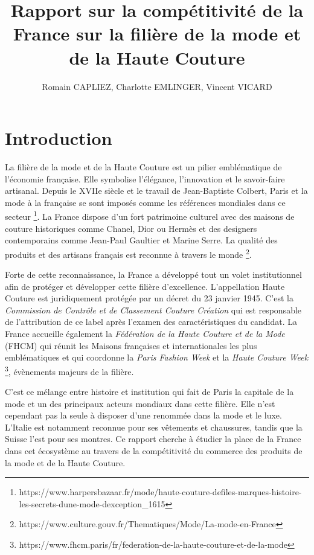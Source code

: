 \documentclass[french,10pt,a4paper]{article}
\title{Rapport sur la compétitivité de la France sur la filière de la mode et de la Haute Couture}
\author{Romain CAPLIEZ, Charlotte EMLINGER, Vincent VICARD}
\begin{document}
\maketitle

\newpage
{}
\tableofcontents
{}

\newpage

\section{Introduction}

La filière de la mode et de la Haute Couture est un pilier emblématique de l'économie française. Elle symbolise l'élégance, l'innovation et le savoir-faire artisanal. Depuis le XVIIe siècle et le travail de Jean-Baptiste Colbert, Paris et la mode à la française se sont imposés comme les références mondiales dans ce secteur \footnote{https://www.harpersbazaar.fr/mode/haute-couture-defiles-marques-histoire-les-secrets-dune-mode-dexception\_1615}. La France dispose d'un fort patrimoine culturel avec des maisons de couture historiques comme Chanel, Dior ou Hermès et des designers contemporains comme Jean-Paul Gaultier et Marine Serre. La qualité des produits et des artisans français est reconnue à travers le monde \footnote{https://www.culture.gouv.fr/Thematiques/Mode/La-mode-en-France}. 

Forte de cette reconnaissance, la France a développé tout un volet institutionnel afin de protéger et développer cette filière d'excellence. L'appellation \og Haute Couture\fg{} est juridiquement protégée par un décret du 23 janvier 1945. C'est la \textit{Commission de Contrôle et de Classement \og Couture Création\fg{}} qui est responsable de l'attribution de ce label après l'examen des caractéristiques du candidat. La France accueille également la \textit{Fédération de la Haute Couture et de la Mode} (FHCM) qui réunit les Maisons françaises et internationales les plus emblématiques et qui coordonne la \textit{Paris Fashion Week} et la \textit{Haute Couture Week} \footnote{https://www.fhcm.paris/fr/federation-de-la-haute-couture-et-de-la-mode}, évènements majeurs de la filière.

C'est ce mélange entre histoire et institution qui fait de Paris la capitale de la mode et un des principaux acteurs mondiaux dans cette filière. Elle n'est cependant pas la seule à disposer d'une renommée dans la mode et le luxe. L'Italie est notamment reconnue pour ses vêtements et chaussures, tandis que la Suisse l'est pour ses montres. Ce rapport cherche à étudier la place de la France dans cet écosystème au travers de la compétitivité du commerce des produits de la mode et de la Haute Couture.
\end{document}
